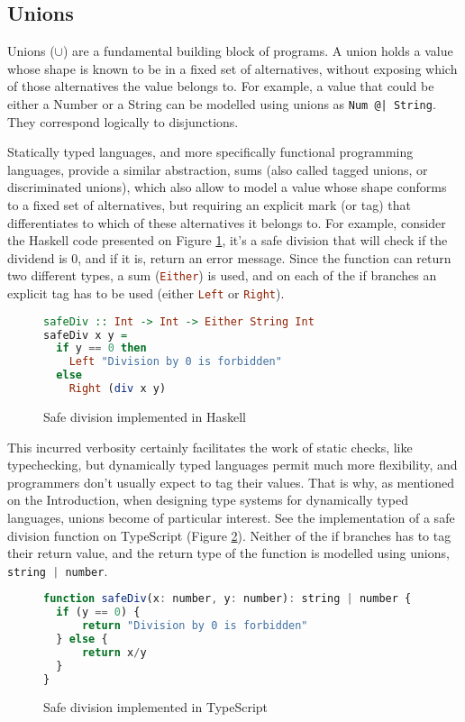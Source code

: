 \documentclass[sigplan,10pt,review,anonymous]{acmart}
\newcommand{\nickel}[1]{\lstinline[language=nickel]{#1}}
\newcommand{\haskell}[1]{\lstinline[language=Haskell]{#1}}
\newcommand{\typescript}[1]{\lstinline[language=JavaScript]{#1}}
\begin{document}
\subsection{Unions}
Unions ($\cup$) are a fundamental building block of programs.
A union holds a value whose
shape is known to be in a fixed set of alternatives, without exposing
which of those alternatives the value belongs to.
For example, a value that could be either a Number or a String can be
modelled using unions as \nickel{Num @| String}.
They correspond logically to disjunctions.

Statically typed languages, and more specifically functional programming
languages, provide a similar abstraction, sums
(also called tagged unions, or discriminated unions), which
also allow to model a value whose shape conforms to a fixed set of
alternatives, but requiring an explicit mark (or tag) that differentiates
to which of these alternatives it belongs to.
For example, consider the Haskell code presented on Figure
\ref{fig:safediv-haskell}, it's a safe division that will
check if the dividend is 0, and if it is, return an
error message.
Since the function can return two different types, a sum
(\haskell{Either}) is used, and on each
of the if branches an explicit tag has to be used (either
\haskell{Left} or \haskell{Right}).

\begin{figure}[h]
\begin{lstlisting}[language=Haskell]
safeDiv :: Int -> Int -> Either String Int
safeDiv x y =
  if y == 0 then
    Left "Division by 0 is forbidden"
  else
    Right (div x y)
\end{lstlisting}
\caption{Safe division implemented in Haskell}
\label{fig:safediv-haskell}
\end{figure}

This incurred verbosity certainly facilitates the work of static checks,
like typechecking, but dynamically typed languages permit much more flexibility,
and programmers don't usually expect to tag their values.
That is why, as mentioned on the Introduction, when designing
type systems for dynamically typed languages, unions become of particular
interest.
See the implementation of a safe division function on TypeScript
(Figure \ref{fig:safediv-ts}).
Neither of the if branches has to tag their return value, and the return
type of the function is modelled using unions, \typescript{string | number}.


\begin{figure}[h]
\begin{lstlisting}[language=JavaScript]
function safeDiv(x: number, y: number): string | number {
  if (y == 0) {
      return "Division by 0 is forbidden"
  } else {
      return x/y
  }
}
\end{lstlisting}
\caption{Safe division implemented in TypeScript}
\label{fig:safediv-ts}
\end{figure}
\end{document}
